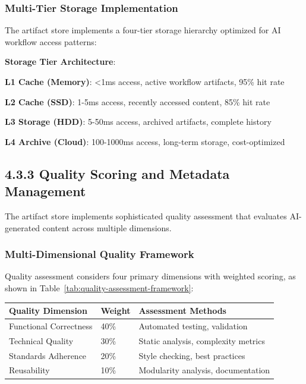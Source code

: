 \subsubsection*{Multi-Tier Storage Implementation}

The artifact store implements a four-tier storage hierarchy optimized for AI workflow access patterns:

\begin{alertbox}
\textbf{Storage Tier Architecture}:
\begin{compactlist}
    \item \textbf{L1 Cache (Memory)}: <1ms access, active workflow artifacts, 95\% hit rate
    \item \textbf{L2 Cache (SSD)}: 1-5ms access, recently accessed content, 85\% hit rate
    \item \textbf{L3 Storage (HDD)}: 5-50ms access, archived artifacts, complete history
    \item \textbf{L4 Archive (Cloud)}: 100-1000ms access, long-term storage, cost-optimized
\end{compactlist}
\end{alertbox}

\subsection*{4.3.3 Quality Scoring and Metadata Management}

The artifact store implements sophisticated quality assessment that evaluates AI-generated content across multiple dimensions.

\subsubsection*{Multi-Dimensional Quality Framework}

Quality assessment considers four primary dimensions with weighted scoring, as shown in Table~\ref{tab:quality-assessment-framework}:

\begin{center}
\begin{tabular}{@{}lll@{}}
\toprule
\textbf{Quality Dimension} & \textbf{Weight} & \textbf{Assessment Methods} \\
\midrule
Functional Correctness & 40\% & Automated testing, validation \\
Technical Quality & 30\% & Static analysis, complexity metrics \\
Standards Adherence & 20\% & Style checking, best practices \\
Reusability & 10\% & Modularity analysis, documentation \\
\bottomrule
\end{tabular}
\label{tab:quality-assessment-framework}
\end{center}

